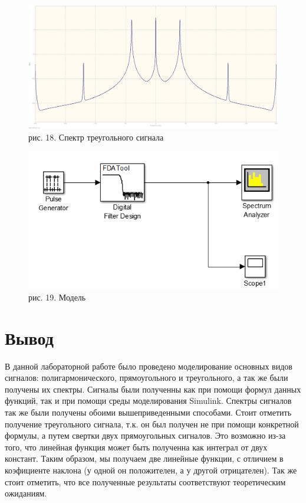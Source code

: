 \documentclass[10pt,a4paper]{report}
\begin{document}
\begin{figure}
\begin{center}
\includegraphics[width=150mm, scale = 0.9]{5_14.jpg}\newline
рис. 18. Спектр треугольного сигнала\newline
\end{center}
\end{figure}
\begin{figure}
\begin{center}
\includegraphics[width=150mm, scale = 0.9]{5_15.jpg}\newline
рис. 19. Модель\newline
\end{center}
\end{figure}
\section{Вывод}
В данной лабораторной работе было проведено моделирование основных видов сигналов: полигармонического, прямоугольного и треугольного, а так же были получены их спектры. Сигналы были полученны как при помощи формул данных функций, так и при помощи среды моделирования Simulink. Спектры сигналов так же были получены обоими вышеприведенными способами. Стоит отметить получение треугольного сигнала, т.к. он был получен не при помощи конкретной формулы, а путем свертки двух прямоугольных сигналов. Это возможно из-за того, что линейная функция может быть полученна как интеграл от двух констант. Таким образом, мы получаем две линейные функции, с отличием в коэфициенте наклона (у одной он положителен, а у другой отрицателен). Так же стоит отметить, что все полученные результаты соответствуют теоретическим ожиданиям.
\end{document}
